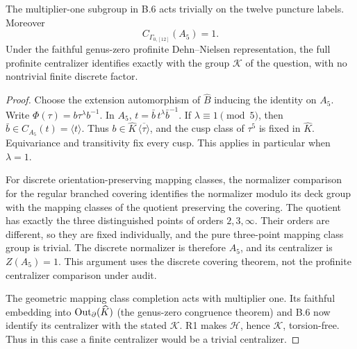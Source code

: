 The multiplier-one subgroup in B.6 acts trivially on the twelve
puncture labels. Moreover
\[
 C_{\Gamma_{0,[12]}}(A_5)=1.
\]
Under the faithful genus-zero profinite Dehn--Nielsen representation,
the full profinite centralizer identifies exactly with the group
\(\mathcal K\) of the question, with no nontrivial finite discrete factor.
\begin{proof}
Choose the extension automorphism of \(\widehat B\) inducing the
identity on \(A_5\). Write
\(\Phi(\tau)=b\tau^\lambda b^{-1}\). In \(A_5\),
\(t=\bar b\,t^\lambda\bar b^{-1}\). If
\(\lambda\equiv1\pmod5\), then
\(\bar b\in C_{A_5}(t)=\langle t\rangle\). Thus
\(b\in\widehat K\,\overline{\langle\tau\rangle}\), and the cusp
class of \(\tau^5\) is fixed in \(\widehat K\).
Equivariance and transitivity fix every cusp. This applies in
particular when \(\lambda=1\).

For discrete orientation-preserving mapping classes, the normalizer
comparison for the regular branched covering identifies the
normalizer modulo its deck group with the mapping classes of the
quotient preserving the covering. The quotient has exactly the
three distinguished points of orders \(2,3,\infty\). Their orders
are different, so they are fixed individually, and the pure
three-point mapping class group is trivial. The discrete normalizer
is therefore \(A_5\), and its centralizer is \(Z(A_5)=1\).
This argument uses the discrete covering theorem, not the
profinite centralizer comparison under audit.

The geometric mapping class completion acts with multiplier one.
Its faithful embedding into \(\operatorname{Out}_{\partial}(\widehat K)\)
(the genus-zero congruence theorem) and B.6 now identify its
centralizer with the stated \(\mathcal K\).
R1 makes \(\mathcal H\), hence \(\mathcal K\), torsion-free.
Thus in this case a finite centralizer would be a trivial centralizer.
\end{proof}
